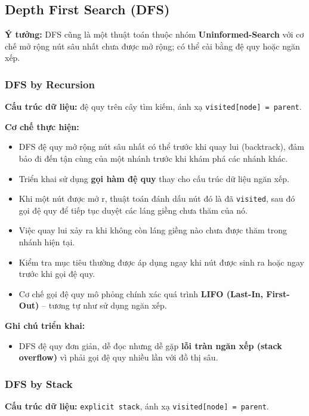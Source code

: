 \subsection{Depth First Search (DFS)}
\textbf{Ý tưởng:} DFS cũng là một thuật toán thuộc nhóm \textbf{Uninformed-Search} với cơ chế mở rộng nút sâu nhất chưa được mở rộng; có thể cài bằng đệ quy hoặc ngăn xếp.

\subsubsection{DFS by Recursion}

\textbf{Cấu trúc dữ liệu:} đệ quy trên cây tìm kiếm, ánh xạ \texttt{visited[node] = parent}.

\textbf{Cơ chế thực hiện:}
\begin{itemize}
    \item DFS đệ quy mở rộng nút sâu nhất có thể trước khi quay lui (backtrack), đảm bảo đi đến tận cùng của một nhánh trước khi khám phá các nhánh khác.
    \item Triển khai sử dụng \textbf{gọi hàm đệ quy} thay cho cấu trúc dữ liệu ngăn xếp.
    \item Khi một nút được mở r, thuật toán đánh dấu nút đó là đã \texttt{visited}, sau đó gọi đệ quy để tiếp tục duyệt các láng giềng chưa thăm của nó.
    \item Việc quay lui xảy ra khi không còn láng giềng nào chưa được thăm trong nhánh hiện tại.
    \item Kiểm tra mục tiêu thường được áp dụng ngay khi nút được sinh ra hoặc ngay trước khi gọi đệ quy.
    \item Cơ chế gọi đệ quy mô phỏng chính xác quá trình \textbf{LIFO (Last-In, First-Out)} – tương tự như sử dụng ngăn xếp.
\end{itemize}

\textbf{Ghi chú triển khai:}
\begin{itemize}
    \item DFS đệ quy đơn giản, dễ đọc nhưng dễ gặp \textbf{lỗi tràn ngăn xếp (stack overflow)} vì phải gọi đệ quy nhiều lần với đồ thị sâu.
\end{itemize}

\subsubsection{DFS by Stack}

\textbf{Cấu trúc dữ liệu:} \texttt{explicit stack}, ánh xạ \texttt{visited[node] = parent}.

